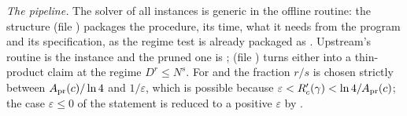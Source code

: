 \emph{The pipeline.}  The solver of all instances is generic in the offline
routine: the structure  (file
) packages the procedure, its time, what it
needs from the program and its specification, as the regime test is already
packaged as .  Upstream's routine is the instance
 and the pruned one is ;
 (file )
turns either into a thin-product claim at the regime \(D^{r}\le N^{s}\).  For
 and  the fraction \(r/s\) is
chosen strictly between \(A_{\mathrm{pr}}(c)/\ln 4\) and \(1/\varepsilon\), which is
possible because \(\varepsilon<R'_{c}(\gamma)<\ln 4/A_{\mathrm{pr}}(c)\); the case
\(\varepsilon\le0\) of the statement is reduced to a positive \(\varepsilon\)
by .
